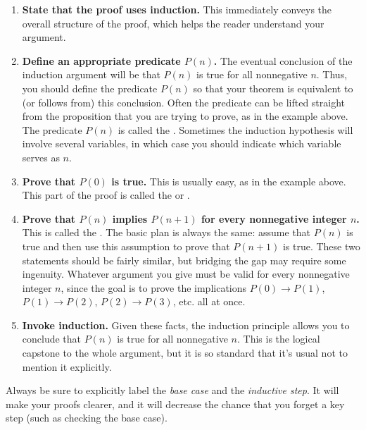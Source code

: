 \begin{enumerate}

\item \textbf{State that the proof uses induction.}  This immediately
conveys the overall structure of the proof, which helps the reader
understand your argument.

\item \textbf{Define an appropriate predicate $P(n)$.}  The eventual
  conclusion of the induction argument will be that $P(n)$ is true for all
  nonnegative $n$.  Thus, you should define the predicate $P(n)$ so that
  your theorem is equivalent to (or follows from) this conclusion.  Often
  the predicate can be lifted straight from the proposition that you
  are trying to prove, as in the example
  above.  The predicate $P(n)$ is called the .
  Sometimes the induction hypothesis will involve several variables, in
  which case you should indicate which variable serves as $n$.

\item \textbf{Prove that $P(0)$ is true.}  This is usually easy, as in the
  example above.  This part of the proof is called the 
  or .


\item \textbf{Prove that $P(n)$ implies $P(n+1)$ for every nonnegative
    integer $n$.}  This is called the .  The basic
  plan is always the same: assume that $P(n)$ is true and then use this
  assumption to prove that $P(n+1)$ is true.  These two statements should
  be fairly similar, but bridging the gap may require some ingenuity.
  Whatever argument you give must be valid for every nonnegative integer
  $n$, since the goal is to prove the implications $P(0) \rightarrow
  P(1)$, $P(1) \rightarrow P(2)$, $P(2) \rightarrow P(3)$, etc. all at
  once.

\item \textbf{Invoke induction.}  Given these facts, the induction
  principle allows you to conclude that $P(n)$ is true for all nonnegative
  $n$.  This is the logical capstone to the whole argument, but it is so
  standard that it's usual not to mention it explicitly.

\end{enumerate}
%
Always be sure to 
explicitly label the \emph{base case} and the \emph{inductive step}.
It will make your proofs clearer, and it will decrease the chance that
you forget a key step (such as checking the base case).

